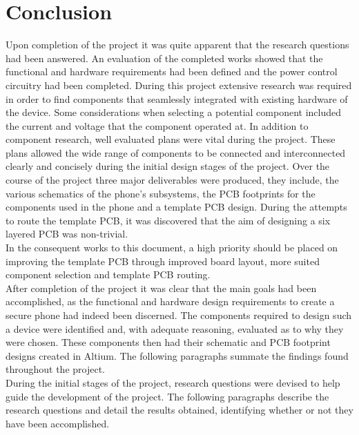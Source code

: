 
\chapter{Conclusion} %

\label{Chapter8} %

	Upon completion of the project it was quite apparent that the research questions had been answered. An evaluation of the completed works showed that the functional and hardware requirements had been defined and the power control circuitry had been completed. During this project extensive research was required in order to find components that seamlessly integrated with existing hardware of the device. Some considerations when selecting a potential component included the current and voltage that the component operated at. In addition to component research, well evaluated plans were vital during the project. These plans allowed the wide range of components to be connected and interconnected clearly and concisely during the initial design stages of the project. Over the course of the project three major deliverables were produced, they include, the various schematics of the phone's subsystems, the PCB footprints for the components used in the phone and a template PCB design. During the attempts to route the template PCB, it was discovered that the aim of designing a six layered PCB was non-trivial.\\
	In the consequent works to this document, a high priority should be placed on improving the template PCB through improved board layout, more suited component selection and template PCB routing. \\

	After completion of the project it was clear that the main goals had been accomplished, as the functional and hardware design requirements to create a secure phone had indeed been discerned. The components required to design such a device were identified and, with adequate reasoning, evaluated as to why they were chosen. These components then had their schematic and PCB footprint designs created in Altium. The following paragraphs summate the findings found throughout the project.\\

	During the initial stages of the project, research questions were devised to help guide the development of the project. The following paragraphs describe the research questions and detail the results obtained, identifying whether or not they have been accomplished.\\

